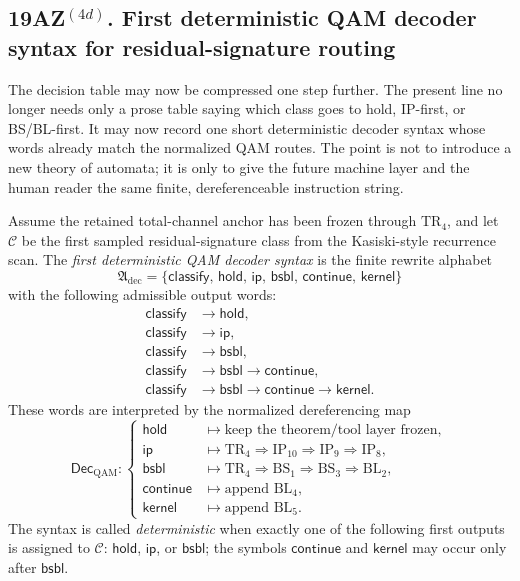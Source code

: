 \subsection*{19AZ$^{(4d)}$. First deterministic QAM decoder syntax for residual-signature routing}
\label{sec:first-deterministic-qam-decoder-syntax-residual-signature-routing}
The decision table may now be compressed one step further. The present line no longer needs only a prose table saying which class goes to hold, IP-first, or BS/BL-first. It may now record one short deterministic decoder syntax whose words already match the normalized QAM routes. The point is not to introduce a new theory of automata; it is only to give the future machine layer and the human reader the same finite, dereferenceable instruction string.

\begin{definition}
\label{def:first-deterministic-qam-decoder-syntax}
Assume the retained total-channel anchor has been frozen through \(\mathrm{TR}_4\), and let \(\mathcal C\) be the first sampled residual-signature class from the Kasiski-style recurrence scan. The \emph{first deterministic QAM decoder syntax} is the finite rewrite alphabet
\[
\mathfrak A_{\mathrm{dec}}=\bigl\{\mathsf{classify},\,\mathsf{hold},\,\mathsf{ip},\,\mathsf{bsbl},\,\mathsf{continue},\,\mathsf{kernel}\bigr\}
\]
with the following admissible output words:
\[
\begin{aligned}
\mathsf{classify}&\to\mathsf{hold},\\
\mathsf{classify}&\to\mathsf{ip},\\
\mathsf{classify}&\to\mathsf{bsbl},\\
\mathsf{classify}&\to\mathsf{bsbl}\to\mathsf{continue},\\
\mathsf{classify}&\to\mathsf{bsbl}\to\mathsf{continue}\to\mathsf{kernel}.
\end{aligned}
\]
These words are interpreted by the normalized dereferencing map
\[
\mathsf{Dec}_{\mathrm{QAM}}:
\begin{cases}
\mathsf{hold} &\mapsto \text{keep the theorem/tool layer frozen},\\[0.3em]
\mathsf{ip} &\mapsto \mathrm{TR}_4 \Rightarrow \mathrm{IP}_{10} \Rightarrow \mathrm{IP}_9 \Rightarrow \mathrm{IP}_8,\\[0.3em]
\mathsf{bsbl} &\mapsto \mathrm{TR}_4 \Rightarrow \mathrm{BS}_1 \Rightarrow \mathrm{BS}_3 \Rightarrow \mathrm{BL}_2,\\[0.3em]
\mathsf{continue} &\mapsto \text{append }\mathrm{BL}_4,\\[0.3em]
\mathsf{kernel} &\mapsto \text{append }\mathrm{BL}_5.
\end{cases}
\]
The syntax is called \emph{deterministic} when exactly one of the following first outputs is assigned to \(\mathcal C\): \(\mathsf{hold}\), \(\mathsf{ip}\), or \(\mathsf{bsbl}\); the symbols \(\mathsf{continue}\) and \(\mathsf{kernel}\) may occur only after \(\mathsf{bsbl}\).
\end{definition}

